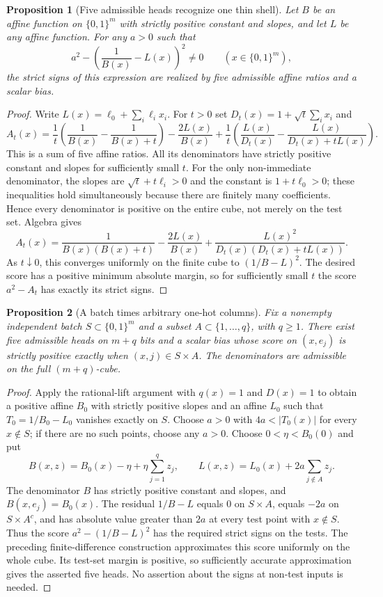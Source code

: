 \documentclass[11pt]{article}
\newtheorem{proposition}{Proposition}
\begin{document}
\begin{proposition}[Five admissible heads recognize one thin shell]
Let $B$ be an affine function on $\{0,1\}^m$ with strictly positive
constant and slopes, and let $L$ be any affine function. For any
$a>0$ such that
\[
 a^2-\left(\frac1{B(x)}-L(x)\right)^2\ne0
 \qquad(x\in\{0,1\}^m),
\]
the strict signs of this expression are realized by five admissible
affine ratios and a scalar bias.
\end{proposition}
\begin{proof}
Write $L(x)=\ell_0+\sum_i\ell_i x_i$. For $t>0$ set
$D_t(x)=1+\sqrt t\sum_i x_i$ and
\[
 A_t(x)=\frac1t\left(\frac1{B(x)}-\frac1{B(x)+t}\right)
       -\frac{2L(x)}{B(x)}
       +\frac1t\left(\frac{L(x)}{D_t(x)}
                    -\frac{L(x)}{D_t(x)+tL(x)}\right).
\]
This is a sum of five affine ratios. All its denominators have
strictly positive constant and slopes for sufficiently small $t$.
For the only non-immediate denominator, the slopes are
$\sqrt t+t\ell_i>0$ and the constant is $1+t\ell_0>0$; these
inequalities hold simultaneously because there are finitely many
coefficients. Hence every denominator is positive on the entire
cube, not merely on the test set. Algebra gives
\[
 A_t(x)=\frac1{B(x)(B(x)+t)}-\frac{2L(x)}{B(x)}
       +\frac{L(x)^2}{D_t(x)(D_t(x)+tL(x))}.
\]
As $t\downarrow0$, this converges uniformly on the finite cube to
$(1/B-L)^2$. The desired score has a positive minimum absolute
margin, so for sufficiently small $t$ the score $a^2-A_t$ has
exactly its strict signs.
\end{proof}

\begin{proposition}[A batch times arbitrary one-hot columns]
Fix a nonempty independent batch $S\subset\{0,1\}^m$ and a subset
$A\subset\{1,\ldots,q\}$, with $q\ge1$. There exist five admissible
heads on $m+q$ bits and a scalar bias whose score on $(x,e_j)$ is
strictly positive exactly when $(x,j)\in S\times A$.
The denominators are admissible on the full $(m+q)$-cube.
\end{proposition}
\begin{proof}
Apply the rational-lift argument with $q(x)=1$ and $D(x)=1$ to
obtain a positive affine $B_0$ with strictly positive slopes and
an affine $L_0$ such that $T_0=1/B_0-L_0$ vanishes exactly on $S$.
Choose $a>0$ with $4a<|T_0(x)|$ for every $x\notin S$; if there
are no such points, choose any $a>0$.
Choose $0<\eta<B_0(0)$ and put
\[
 B(x,z)=B_0(x)-\eta+\eta\sum_{j=1}^qz_j,
 \qquad L(x,z)=L_0(x)+2a\sum_{j\notin A}z_j.
\]
The denominator $B$ has strictly positive constant and slopes, and
$B(x,e_j)=B_0(x)$. The residual $1/B-L$ equals $0$ on $S\times A$,
equals $-2a$ on $S\times A^c$, and has absolute value greater than
$2a$ at every test point with $x\notin S$. Thus the score
$a^2-(1/B-L)^2$ has the required strict signs on the tests.
The preceding finite-difference construction approximates this
score uniformly on the whole cube. Its test-set margin is positive,
so sufficiently accurate approximation gives the asserted five
heads. No assertion about the signs at non-test inputs is needed.
\end{proof}
\end{document}
